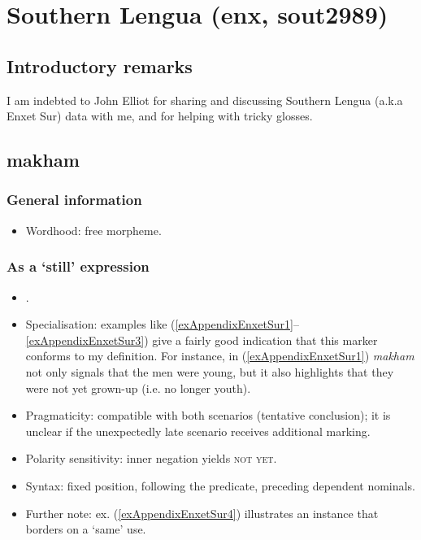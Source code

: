 \section{Southern Lengua (enx, sout2989)}
\label{appendixEnxetSur}

\subsection{Introductory remarks}
I am indebted to John Elliot for sharing and discussing Southern Lengua (a.k.a Enxet Sur) data with me, and for helping with tricky glosses.

\subsection{makham}
\subsubsection{General information}
\begin{itemize}
	\item Wordhood: free morpheme.
\end{itemize}

\subsubsection{As a \lq{}still\rq{ }expression}
\begin{itemize}
	\item \textcite[483–486]{Elliot2021}.
	\item Specialisation: examples like (\ref{exAppendixEnxetSur1}–\ref{exAppendixEnxetSur3}) give a fairly good indication that this marker conforms to my definition. For instance, in (\ref{exAppendixEnxetSur1}) \textit{makham} not only signals that the men were young, but it also highlights that they were not yet grown-up (i.e. no longer youth).
	\item Pragmaticity: compatible with both scenarios (tentative conclusion); it is unclear if the unexpectedly late scenario receives additional marking.
	\item Polarity sensitivity: inner negation yields \textsc{not yet}.
		\item Syntax: fixed position, following the predicate, preceding dependent nominals.
	\item Further note: ex. (\ref{exAppendixEnxetSur4}) illustrates an instance that borders on a \lq same\rq{ }use.
\end{itemize}

